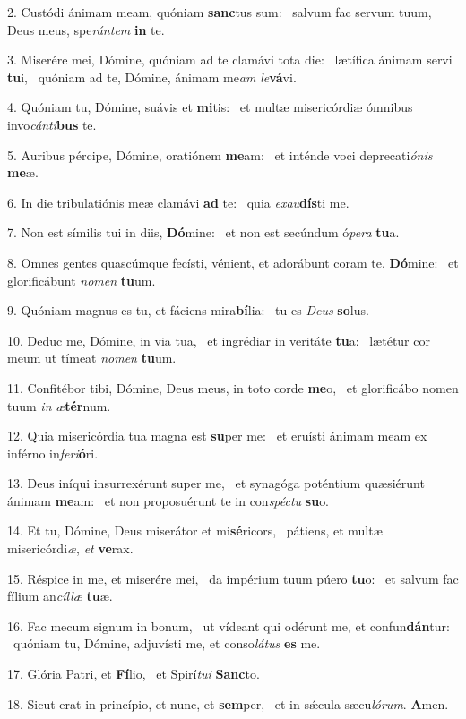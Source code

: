 2. Custódi ánimam meam, quóniam \textbf{sanc}tus sum: \ast\  salvum fac servum tuum, Deus meus, spe\textit{rán}\textit{tem} \textbf{in} te.\

3. Miserére mei, Dómine, quóniam ad te clamávi tota die: \dag\  lætífica ánimam servi \textbf{tu}i, \ast\  quóniam ad te, Dómine, ánimam me\textit{am} \textit{le}\textbf{vá}vi.\

4. Quóniam tu, Dómine, suávis et \textbf{mi}tis: \ast\  et multæ misericórdiæ ómnibus invo\textit{cán}\textit{ti}\textbf{bus} te.\

5. Auribus pércipe, Dómine, oratiónem \textbf{me}am: \ast\  et inténde voci deprecati\textit{ó}\textit{nis} \textbf{me}æ.\

6. In die tribulatiónis meæ clamávi \textbf{ad} te: \ast\  quia \textit{ex}\textit{au}\textbf{dís}ti me.\

7. Non est símilis tui in diis, \textbf{Dó}mine: \ast\  et non est secúndum ó\textit{pe}\textit{ra} \textbf{tu}a.\

8. Omnes gentes quascúmque fecísti, vénient, et adorábunt coram te, \textbf{Dó}mine: \ast\  et glorificábunt \textit{no}\textit{men} \textbf{tu}um.\

9. Quóniam magnus es tu, et fáciens mira\textbf{bí}lia: \ast\  tu es \textit{De}\textit{us} \textbf{so}lus.\

10. Deduc me, Dómine, in via tua, \dag\  et ingrédiar in veritáte \textbf{tu}a: \ast\  lætétur cor meum ut tímeat \textit{no}\textit{men} \textbf{tu}um.\

11. Confitébor tibi, Dómine, Deus meus, in toto corde \textbf{me}o, \ast\  et glorificábo nomen tuum \textit{in} \textit{æ}\textbf{tér}num.\

12. Quia misericórdia tua magna est \textbf{su}per me: \ast\  et eruísti ánimam meam ex inférno in\textit{fe}\textit{ri}\textbf{ó}ri.\

13. Deus iníqui insurrexérunt super me, \dag\  et synagóga poténtium quæsiérunt ánimam \textbf{me}am: \ast\  et non proposuérunt te in con\textit{spéc}\textit{tu} \textbf{su}o.\

14. Et tu, Dómine, Deus miserátor et mi\textbf{sé}ricors, \ast\  pátiens, et multæ misericórdi\textit{æ}, \textit{et} \textbf{ve}rax.\

15. Réspice in me, et miserére mei, \dag\  da impérium tuum púero \textbf{tu}o: \ast\  et salvum fac fílium an\textit{cíl}\textit{læ} \textbf{tu}æ.\

16. Fac mecum signum in bonum, \dag\  ut vídeant qui odérunt me, et confun\textbf{dán}tur: \ast\  quóniam tu, Dómine, adjuvísti me, et conso\textit{lá}\textit{tus} \textbf{es} me.\

17. Glória Patri, et \textbf{Fí}lio, \ast\  et Spirí\textit{tu}\textit{i} \textbf{Sanc}to.\

18. Sicut erat in princípio, et nunc, et \textbf{sem}per, \ast\  et in sǽcula sæcu\textit{ló}\textit{rum}. \textbf{A}men.\


